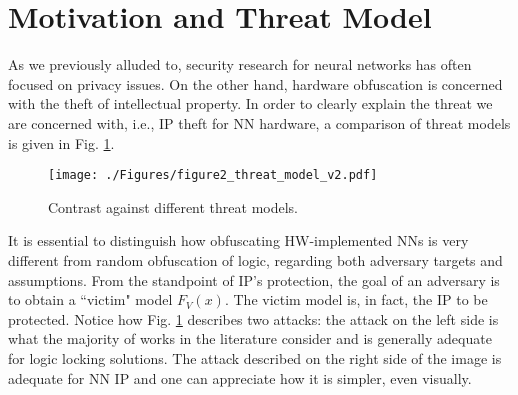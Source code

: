 \documentclass[10pt, twocolumn, conference]{IEEEtran}
\begin{document}

\section{Motivation and Threat Model} \label{sec:orctrb}

As we previously alluded to, security research for neural networks has often focused on privacy issues. On the other hand, hardware obfuscation is concerned with the theft of intellectual property. In order to clearly explain the threat we are concerned with, i.e., IP theft for NN hardware, a comparison of threat models is given in Fig. \ref{figCMP}.

\begin{figure}[tb]
\centering
{\texttt{[image: ./Figures/figure2\_threat\_model\_v2.pdf]}} \vspace{-10pt}
\caption{Contrast against different threat models.} \vspace{-10pt}
\label{figCMP}
\end{figure}


It is essential to distinguish how obfuscating HW-implemented NNs is very different from random obfuscation of logic, regarding both adversary targets and assumptions. From the standpoint of IP's protection, the goal of an adversary is to obtain a ``victim" model $F_V(x)$. The victim model is, in fact, the IP to be protected. Notice how Fig. \ref{figCMP} describes two attacks: the attack on the left side is what the majority of works in the literature consider and is generally adequate for logic locking solutions. The attack described on the right side of the image is adequate for NN IP and one can appreciate how it is simpler, even visually.
\end{document}
